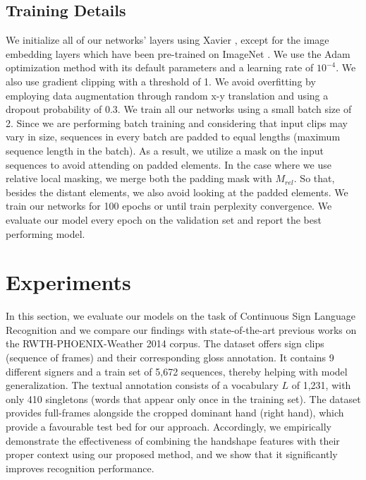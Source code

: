 \documentclass[a4paper,conference]{IEEEtran}
\begin{document}
	
\subsection{Training Details}

We initialize all of our networks' layers using Xavier \cite{glorot2010understanding}, except for the image embedding layers which have been pre-trained on ImageNet \cite{deng2009imagenet}. We use the Adam \cite{kingma2014adam} optimization method with its default parameters and a learning rate of $10^{-4}$.  We also use gradient clipping with a threshold of 1. We avoid overfitting by employing data augmentation through random x-y translation and using a dropout probability of $0.3$. We train all our networks using a small batch size of 2. Since we are performing batch training and considering that input clips may vary in size, sequences in every batch are padded to equal lengths (maximum sequence length in the batch). As a result, we utilize a mask on the input sequences to avoid attending on padded elements. In the case where we use relative local masking, we merge both the padding mask with $M_{rel}$. So that, besides the distant elements, we also avoid looking at the padded elements. 
We train our networks for 100 epochs or until train perplexity convergence. We evaluate our model every epoch on the validation set and report the best performing model. 


\section{Experiments}

In this section, we evaluate our models on the task of Continuous Sign Language Recognition and we compare our findings with state-of-the-art previous works on the RWTH-PHOENIX-Weather 2014 corpus. The dataset offers sign clips (sequence of frames) and their corresponding gloss annotation. It contains 9 different signers and a train set of 5,672 sequences, thereby helping with model generalization. The textual annotation consists of a vocabulary $L$ of 1,231, with only 410 singletons (words that appear only once in the training set). The dataset provides full-frames alongside the cropped dominant hand (right hand), which provide a favourable test bed for our approach. Accordingly, we empirically demonstrate the effectiveness of combining the handshape features with their proper context using our proposed method, and we show that it significantly improves recognition performance. 
\end{document}
